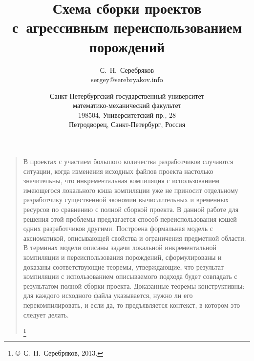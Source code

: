 \documentclass[a5paper]{article}
\title{Схема сборки проектов\\
с~агрессивным переиспользованием порождений}
\author{
С.~Н.~Серебряков\\
sergey@serebryakov.info\\
\and Санкт-Петербургский государственный университет\\
математико-механический факультет\\
198504, Университетский пр., 28\\
Петродворец, Санкт-Петербург, Россия}
\date{}
\begin{document}
\maketitle
\thispagestyle{empty}

\begin{quote}
\small\noindent В проектах с участием большого количества разработчиков случаются ситуации, когда изменения исходных файлов проекта настолько значительны, что инкрементальная компиляция с использованием имеющегося локального кэша компиляции уже не приносит отдельному разработчику существенной экономии вычислительных и временных ресурсов по сравнению с полной сборкой проекта.
В данной работе для решения этой проблемы предлагается способ переиспользования кэшей одних разработчиков другими. Построена формальная модель с аксиоматикой, описывающей свойства и ограничения предметной области. В терминах модели описаны задачи локальной инкрементальной компиляции и переиспользования порождений, сформулированы и доказаны соответствующие теоремы, утверждающие, что результат компиляции с использованием описываемого подхода будет совпадать с результатом полной сборки проекта. Доказанные теоремы конструктивны: для каждого исходного файла указывается, нужно ли его перекомпилировать, и если да, то предъявляется контекст, в котором это следует делать.

\renewcommand{\thefootnote}{}

\footnote{\small{\copyright~С.~Н.~Серебряков, 2013.}}
\renewcommand{\thefootnote}{\arabic{footnote}}
\setcounter{footnote}{0}
\end{quote}








\end{document}
